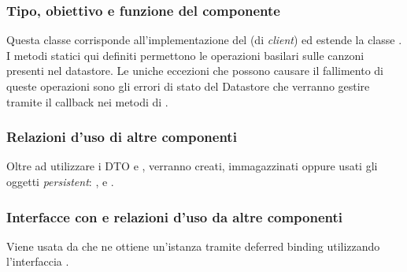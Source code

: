 \subsubsection*{Tipo, obiettivo e funzione del componente}
Questa classe corrisponde all'implementazione del  (di
\emph{client}) ed estende la classe . I metodi statici
qui definiti permettono le operazioni basilari sulle canzoni presenti nel
datastore. Le uniche eccezioni che possono causare il fallimento di queste
operazioni sono gli errori di stato del Datastore  che
verranno gestire tramite il callback nei metodi di .
\subsubsection*{Relazioni d'uso di altre componenti} Oltre ad utilizzare i DTO
 e , verranno creati, immagazzinati oppure usati
gli oggetti \emph{persistent}: ,  e .
\subsubsection*{Interfacce con e relazioni d'uso da altre componenti} Viene
usata da  che ne ottiene un'istanza tramite deferred
binding utilizzando l'interfaccia . 
